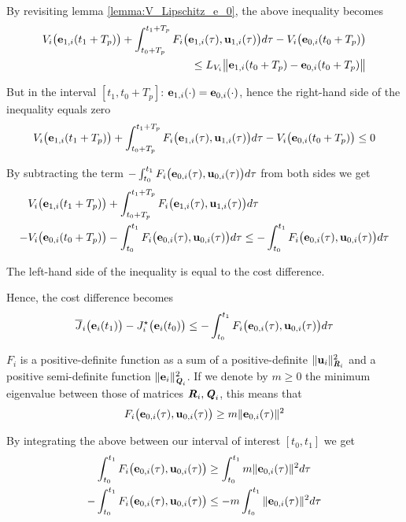 \begin{gg_box}
  By revisiting lemma \eqref{lemma:V_Lipschitz_e_0}, the above inequality
  becomes
  \begin{align}
    V_i\big(\bm{\mathbf{e}}_{1,i}(t_1 + T_p)\big)
    + \int_{t_0 + T_p}^{t_1 + T_p} F_i\big(\bm{\mathbf{e}}_{1,i}(\tau), \bm{\mathbf{u}}_{1,i}(\tau)\big) d\tau
    - V_i\big(\bm{\mathbf{e}}_{0,i}(t_0 + T_p)\big) \\
    \leq L_{V_i} \big\|\bm{\mathbf{e}}_{1,i}(t_0 + T_p) - \bm{\mathbf{e}}_{0,i}(t_0 + T_p)\big\|
  \end{align}

  But in the interval $[t_1, t_0 + T_p]$:
  $\bm{\mathbf{e}}_{1,i}(\cdot) = \bm{\mathbf{e}}_{0,i}(\cdot)$, hence the right-hand side
  of the inequality equals zero
  \begin{align}
    V_i\big(\bm{\mathbf{e}}_{1,i}(t_1 + T_p)\big)
    + \int_{t_0 + T_p}^{t_1 + T_p} F_i\big(\bm{\mathbf{e}}_{1,i}(\tau), \bm{\mathbf{u}}_{1,i}(\tau)\big) d\tau
    - V_i\big(\bm{\mathbf{e}}_{0,i}(t_0 + T_p)\big) \leq 0
  \end{align}

  By subtracting the term
  $-\int_{t_0}^{t_1} F_i \big(\bm{\mathbf{e}}_{0,i}(\tau), \bm{\mathbf{u}}_{0,i} (\tau)\big) d \tau$
  from both sides we get
  \begin{align}
    &V_i\big(\bm{\mathbf{e}}_{1,i}(t_1 + T_p)\big)
    + \int_{t_0 + T_p}^{t_1 + T_p} F_i\big(\bm{\mathbf{e}}_{1,i}(\tau), \bm{\mathbf{u}}_{1,i}(\tau)\big) d\tau \\
    - &V_i\big(\bm{\mathbf{e}}_{0,i}(t_0 + T_p)\big)
    -\int_{t_0}^{t_1} F_i \big(\bm{\mathbf{e}}_{0,i}(\tau), \bm{\mathbf{u}}_{0,i} (\tau)\big) d \tau
    \leq -\int_{t_0}^{t_1} F_i \big(\bm{\mathbf{e}}_{0,i}(\tau), \bm{\mathbf{u}}_{0,i} (\tau)\big) d \tau
  \end{align}

  The left-hand side of the inequality is equal to the cost difference.
\end{gg_box}

Hence, the cost difference becomes
\begin{align}
  \overline{J}_i\big(\bm{\mathbf{e}}_i(t_1)\big) - J_i^{\star}\big(\bm{\mathbf{e}}_i(t_0)\big) \leq
    -\int_{t_0}^{t_1} F_i \big(\bm{\mathbf{e}}_{0,i}(\tau), \bm{\mathbf{u}}_{0,i} (\tau)\big) d \tau
\end{align}

\begin{gg_box}
  $F_i$ is a positive-definite function as a sum of a positive-definite
  $\|\bm{\mathbf{u}}_i\|^2_{\bm{\mathit{R}}_i}$ and a positive semi-definite function
  $\|\bm{\mathbf{e}}_i\|^2_{\bm{\mathit{Q}}_i}$. If we denote by $m \geq 0$ the
  minimum eigenvalue between those of matrices $\bm{\mathit{R}}_i, \bm{\mathit{Q}}_i$, this
  means that
  $$F_i \big(\bm{\mathbf{e}}_{0,i}(\tau), \bm{\mathbf{u}}_{0,i} (\tau)\big) \geq m \|\bm{\mathbf{e}}_{0,i}(\tau)\|^2$$

  By integrating the above between our interval of interest $[t_0, t_1]$ we get
  \begin{align}
    \int_{t_0}^{t_1} F_i \big(\bm{\mathbf{e}}_{0,i}(\tau), \bm{\mathbf{u}}_{0,i} (\tau)\big) &\geq \int_{t_0}^{t_1} m \|\bm{\mathbf{e}}_{0,i}(\tau)\|^2 d\tau \\
    -\int_{t_0}^{t_1} F_i \big(\bm{\mathbf{e}}_{0,i}(\tau), \bm{\mathbf{u}}_{0,i} (\tau)\big) &\leq -m \int_{t_0}^{t_1} \|\bm{\mathbf{e}}_{0,i}(\tau)\|^2 d\tau
  \end{align}
\end{gg_box}

